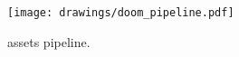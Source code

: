 \begin{figure}[H]
\centering
\texttt{[image: drawings/doom\_pipeline.pdf]}
\caption{\doom{} assets pipeline.}
\end{figure}
